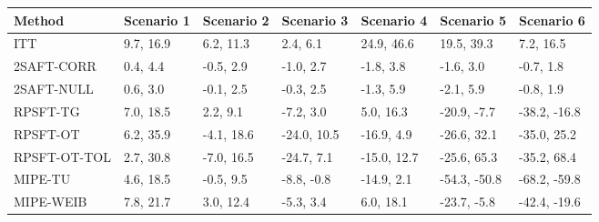 \begingroup\small
\begin{tabular}{lllllll}
  \hline
\hline
Method & Scenario 1 & Scenario 2 & Scenario 3 & Scenario 4 & Scenario 5 & Scenario 6 \\ 
  \hline
ITT &  9.7, 16.9 &  6.2, 11.3 &  2.4,  6.1 & 24.9, 46.6 & 19.5, 39.3 &  7.2, 16.5 \\ 
  2SAFT-CORR &  0.4, 4.4 & -0.5, 2.9 & -1.0, 2.7 & -1.8, 3.8 & -1.6, 3.0 & -0.7, 1.8 \\ 
  2SAFT-NULL &  0.6, 3.0 & -0.1, 2.5 & -0.3, 2.5 & -1.3, 5.9 & -2.1, 5.9 & -0.8, 1.9 \\ 
  RPSFT-TG &   7.0,  18.5 &   2.2,   9.1 &  -7.2,   3.0 &   5.0,  16.3 & -20.9,  -7.7 & -38.2, -16.8 \\ 
  RPSFT-OT &   6.2, 35.9 &  -4.1, 18.6 & -24.0, 10.5 & -16.9,  4.9 & -26.6, 32.1 & -35.0, 25.2 \\ 
  RPSFT-OT-TOL &   2.7, 30.8 &  -7.0, 16.5 & -24.7,  7.1 & -15.0, 12.7 & -25.6, 65.3 & -35.2, 68.4 \\ 
  MIPE-TU &   4.6,  18.5 &  -0.5,   9.5 &  -8.8,  -0.8 & -14.9,   2.1 & -54.3, -50.8 & -68.2, -59.8 \\ 
  MIPE-WEIB &   7.8,  21.7 &   3.0,  12.4 &  -5.3,   3.4 &   6.0,  18.1 & -23.7,  -5.8 & -42.4, -19.6 \\ 
   \hline
\end{tabular}
\endgroup
